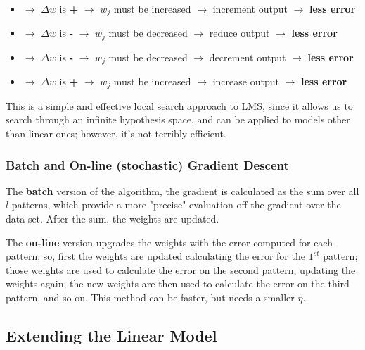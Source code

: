 \begin{itemize}
    \item {} $\rightarrow$ $\Delta w$ is \textbf{+} $\rightarrow$ $w_j$ must be increased $\rightarrow$ increment output $\rightarrow$ \textbf{less error}

    \item {} $\rightarrow$ $\Delta w$ is \textbf{-} $\rightarrow$ $w_j$ must be decreased $\rightarrow$ reduce output $\rightarrow$ \textbf{less error}

    \item {} $\rightarrow$ $\Delta w$ is \textbf{-} $\rightarrow$ $w_j$ must be decreased $\rightarrow$ decrement output $\rightarrow$ \textbf{less error}

    \item {} $\rightarrow$ $\Delta w$ is \textbf{+} $\rightarrow$ $w_j$ must be increased $\rightarrow$ increase output $\rightarrow$ \textbf{less error}
\end{itemize}

This is a simple and effective local search approach to LMS, since it allows us to search through an infinite hypothesis space, and can be applied to models other than linear ones; however, it's not terribly efficient.

\subsubsection{Batch and On-line (stochastic) Gradient Descent}
The \textbf{batch} version of the algorithm, the gradient is calculated as the sum over all $l$ patterns, which provide a more "precise" evaluation off the gradient over the data-set. After the sum, the weights are updated.

The \textbf{on-line} version upgrades the weights with the error computed for each pattern; so, first the weights are updated calculating the error for the $1^{st}$ pattern; those weights are used to calculate the error on the second pattern, updating the weights again; the new weights are then used to calculate the error on the third pattern, and so on. This method can be faster, but needs a smaller $\eta$.

\subsection{Extending the Linear Model}

